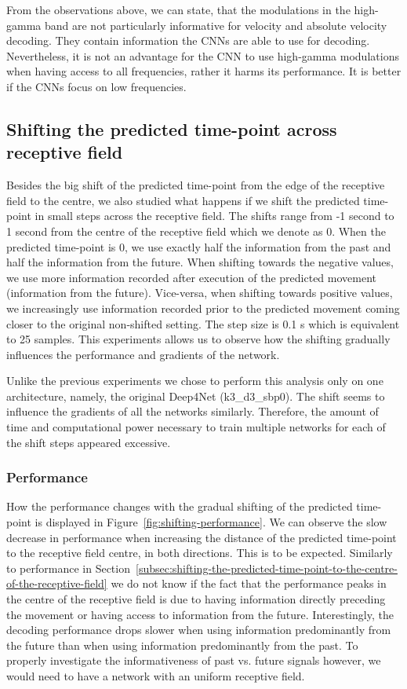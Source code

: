 From the observations above, we can state, that the modulations in the high-gamma band are not particularly informative for velocity and absolute velocity decoding.
They contain information the CNNs are able to use for decoding. 
Nevertheless, it is not an advantage for the CNN to use high-gamma modulations when having access to all frequencies, rather it harms its performance.
It is better if the CNNs focus on low frequencies.

\subsection{Shifting the predicted time-point across receptive field}\label{subsec:shifting-the-predicted-time-point-across-receptive-field}
Besides the big shift of the predicted time-point from the edge of the receptive field to the centre, we also studied what happens if we shift the predicted time-point in small steps across the receptive field. 
The shifts range from  -1 second  to 1 second from the centre of the receptive field which we denote as 0.
When the predicted time-point is 0, we use exactly half the information from the past and half the information from the future.
When shifting towards the negative values, we use more information recorded after execution of the predicted movement (information from the future). 
Vice-versa, when shifting towards positive values, we increasingly use information recorded prior to the predicted movement coming closer to the original non-shifted setting.  
The step size is 0.1 s which is equivalent to 25 samples.
This experiments allows us to observe how the shifting gradually influences the performance and gradients of the network. 

Unlike the previous experiments we chose to perform this analysis only on one architecture, namely, the original Deep4Net (k3\_d3\_sbp0). 
The shift seems to influence the gradients of all the networks similarly.
Therefore, the amount of time and computational power necessary to train multiple networks for each of the shift steps appeared excessive.  

\subsubsection{Performance}\label{subsubsec:across-shiftig-performace}
How the performance changes with the gradual shifting of the predicted time-point is displayed in Figure~\ref{fig:shifting-performance}.
We can observe the slow decrease in performance when increasing the distance of the predicted time-point to the receptive field centre, in both directions. 
This is to be expected. 
Similarly to performance in Section~\ref{subsec:shifting-the-predicted-time-point-to-the-centre-of-the-receptive-field} we do not know if the fact that the performance peaks in the centre of the receptive field is due to having information directly preceding the movement or having access to information from the future. 
Interestingly, the decoding performance drops slower when using information predominantly from the future than when using information predominantly from the past.
To properly investigate the informativeness of past vs. future signals however, we would need to have a network with an uniform receptive field. 

